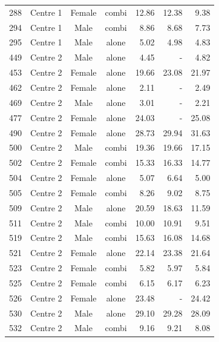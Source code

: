 \begin{table}
\begin{tabular}{|cccc|rrr|}
288&Centre 1&Female&combi&12.86&12.38&9.38\\
294&Centre 1&Male&combi&8.86&8.68&7.73\\
295&Centre 1&Male&alone&5.02&4.98&4.83\\
449&Centre 2&Male&alone&4.45&-&4.82\\
453&Centre 2&Female&alone&19.66&23.08&21.97\\
462&Centre 2&Female&alone&2.11&-&2.49\\
469&Centre 2&Male&alone&3.01&-&2.21\\
477&Centre 2&Female&alone&24.03&-&25.08\\
490&Centre 2&Female&alone&28.73&29.94&31.63\\
500&Centre 2&Male&combi&19.36&19.66&17.15\\
502&Centre 2&Female&combi&15.33&16.33&14.77\\
504&Centre 2&Female&alone&5.07&6.64&5.00\\
505&Centre 2&Female&combi&8.26&9.02&8.75\\
509&Centre 2&Male&alone&20.59&18.63&11.59\\
511&Centre 2&Male&combi&10.00&10.91&9.51\\
519&Centre 2&Male&combi&15.63&16.08&14.68\\
521&Centre 2&Female&alone&22.14&23.38&21.64\\
523&Centre 2&Female&combi&5.82&5.97&5.84\\
525&Centre 2&Female&combi&6.15&6.17&6.23\\
526&Centre 2&Female&alone&23.48&-&24.42\\
530&Centre 2&Male&alone&29.10&29.28&28.09\\
532&Centre 2&Male&combi&9.16&9.21&8.08\\
\hline
\end{tabular}
\end{table}